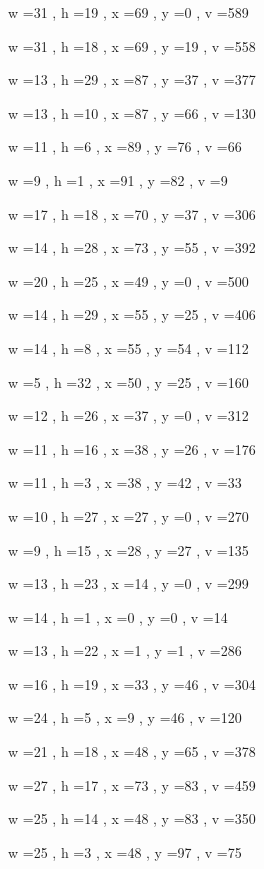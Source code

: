 \documentclass[11pt]{article}
\begin{document}
w =31 , h =19 , x =69 , y =0 , v =589
\par
w =31 , h =18 , x =69 , y =19 , v =558
\par
w =13 , h =29 , x =87 , y =37 , v =377
\par
w =13 , h =10 , x =87 , y =66 , v =130
\par
w =11 , h =6 , x =89 , y =76 , v =66
\par
w =9 , h =1 , x =91 , y =82 , v =9
\par
w =17 , h =18 , x =70 , y =37 , v =306
\par
w =14 , h =28 , x =73 , y =55 , v =392
\par
w =20 , h =25 , x =49 , y =0 , v =500
\par
w =14 , h =29 , x =55 , y =25 , v =406
\par
w =14 , h =8 , x =55 , y =54 , v =112
\par
w =5 , h =32 , x =50 , y =25 , v =160
\par
w =12 , h =26 , x =37 , y =0 , v =312
\par
w =11 , h =16 , x =38 , y =26 , v =176
\par
w =11 , h =3 , x =38 , y =42 , v =33
\par
w =10 , h =27 , x =27 , y =0 , v =270
\par
w =9 , h =15 , x =28 , y =27 , v =135
\par
w =13 , h =23 , x =14 , y =0 , v =299
\par
w =14 , h =1 , x =0 , y =0 , v =14
\par
w =13 , h =22 , x =1 , y =1 , v =286
\par
w =16 , h =19 , x =33 , y =46 , v =304
\par
w =24 , h =5 , x =9 , y =46 , v =120
\par
w =21 , h =18 , x =48 , y =65 , v =378
\par
w =27 , h =17 , x =73 , y =83 , v =459
\par
w =25 , h =14 , x =48 , y =83 , v =350
\par
w =25 , h =3 , x =48 , y =97 , v =75
\par
\newpage
\end{document}
